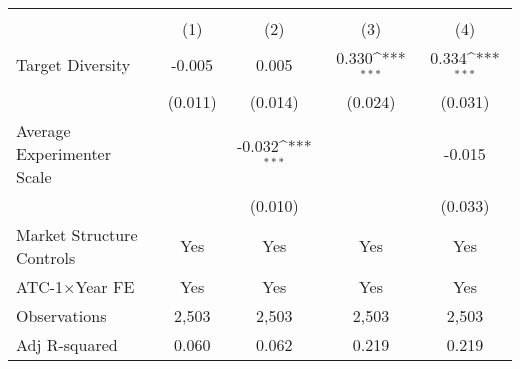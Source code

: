 {
\def\sym#1{\ifmmode^{#1}\else\(^{#1}\)\fi}
\begin{tabular}{l*{4}{c}}
\hline\hline
                                        &&\\\cmidrule(lr){2-3}\cmidrule(lr){4-5}
                                        &         &         &         &         \\
\hline
Target Diversity                        &      -0.005         &       0.005         &       0.330\sym{***}&       0.334\sym{***}\\
                                        &     (0.011)         &     (0.014)         &     (0.024)         &     (0.031)         \\
Average Experimenter Scale              &                     &      -0.032\sym{***}&                     &      -0.015         \\
                                        &                     &     (0.010)         &                     &     (0.033)         \\
\hline
Market Structure Controls               &         Yes         &         Yes         &         Yes         &         Yes         \\
ATC-1$\times$Year FE                    &         Yes         &         Yes         &         Yes         &         Yes         \\
Observations                            &       2,503         &       2,503         &       2,503         &       2,503         \\
Adj R-squared                           &       0.060         &       0.062         &       0.219         &       0.219         \\
\hline\hline
\end{tabular}
}
